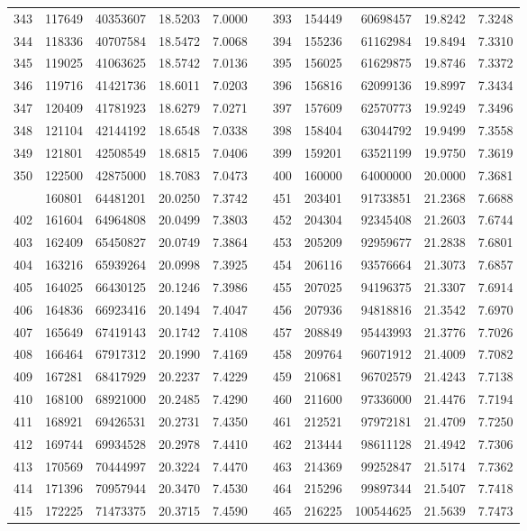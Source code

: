 \begin{longtable}{rrrrrrrrrrr}
343&117649&40353607&18.5203&7.0000&&393&154449&60698457&19.8242&7.3248\\
344&118336&40707584&18.5472&7.0068&&394&155236&61162984&19.8494&7.3310\\
345&119025&41063625&18.5742&7.0136&&395&156025&61629875&19.8746&7.3372\\
346&119716&41421736&18.6011&7.0203&&396&156816&62099136&19.8997&7.3434\\
347&120409&41781923&18.6279&7.0271&&397&157609&62570773&19.9249&7.3496\\
348&121104&42144192&18.6548&7.0338&&398&158404&63044792&19.9499&7.3558\\
349&121801&42508549&18.6815&7.0406&&399&159201&63521199&19.9750&7.3619\\
350&122500&42875000&18.7083&7.0473&&400&160000&64000000&20.0000&7.3681\\
\newpage
401&160801&64481201&20.0250&7.3742&&451&203401&91733851&21.2368&7.6688\\
402&161604&64964808&20.0499&7.3803&&452&204304&92345408&21.2603&7.6744\\
403&162409&65450827&20.0749&7.3864&&453&205209&92959677&21.2838&7.6801\\
404&163216&65939264&20.0998&7.3925&&454&206116&93576664&21.3073&7.6857\\
405&164025&66430125&20.1246&7.3986&&455&207025&94196375&21.3307&7.6914\\
406&164836&66923416&20.1494&7.4047&&456&207936&94818816&21.3542&7.6970\\
407&165649&67419143&20.1742&7.4108&&457&208849&95443993&21.3776&7.7026\\
408&166464&67917312&20.1990&7.4169&&458&209764&96071912&21.4009&7.7082\\
409&167281&68417929&20.2237&7.4229&&459&210681&96702579&21.4243&7.7138\\
410&168100&68921000&20.2485&7.4290&&460&211600&97336000&21.4476&7.7194\\
411&168921&69426531&20.2731&7.4350&&461&212521&97972181&21.4709&7.7250\\
412&169744&69934528&20.2978&7.4410&&462&213444&98611128&21.4942&7.7306\\
413&170569&70444997&20.3224&7.4470&&463&214369&99252847&21.5174&7.7362\\
414&171396&70957944&20.3470&7.4530&&464&215296&99897344&21.5407&7.7418\\
415&172225&71473375&20.3715&7.4590&&465&216225&100544625&21.5639&7.7473\\

\end{longtable}
